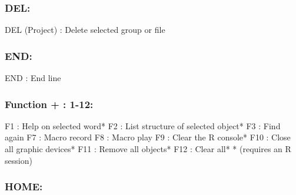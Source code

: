 \subsubsection{DEL:}

\vspace{-0.5cm}
\begin{Rtables}[caption={[DEL keyboard shortcut]
    DEL keyboard shortcut},
  label=shortcut:del]
  DEL (Project)   : Delete selected group or file
\end{Rtables}


\subsubsection{END:}

\vspace{-0.5cm}
\begin{Rtables}[caption={[END keyboard shortcut]
    END keyboard shortcut},
  label=shortcut:end]
  END             : End line
\end{Rtables}


\subsubsection{Function + : 1-12:}

\vspace{-0.5cm}
\begin{Rtables}[caption={[Function + keyboard shortcuts]
    Function + keyboard shortcuts},
  label=shortcut:funplus]
  F1      : Help on selected word*
  F2      : List structure of selected object*
  F3      : Find again
  F7      : Macro record
  F8      : Macro play
  F9      : Clear the R console*
  F10     : Close all graphic devices*
  F11     : Remove all objects*
  F12     : Clear all*
  * (requires an R session)
\end{Rtables}


\subsubsection{HOME:}

